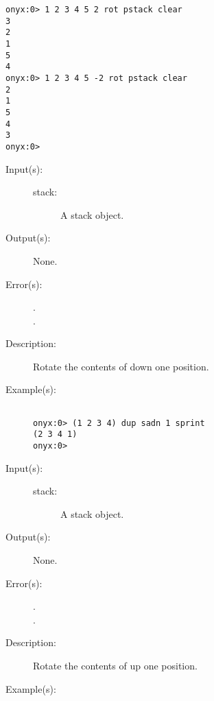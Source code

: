 \begin{description}
\begin{description}
\begin{verbatim}
onyx:0> 1 2 3 4 5 2 rot pstack clear
3
2
1
5
4
onyx:0> 1 2 3 4 5 -2 rot pstack clear
2
1
5
4
3
onyx:0>
		\end{verbatim}
	\end{description}
\label{systemdict:sadn}
\item[{\onyxop{stack}{sadn}{--}}: ]
	\begin{description}\item[]
	\item[Input(s): ]
		\begin{description}\item[]
		\item[stack: ]
			A stack object.
		\end{description}
	\item[Output(s): ] None.
	\item[Error(s): ]
		\begin{description}\item[]
		\item[.]
		\item[.]
		\end{description}
	\item[Description: ]
		Rotate the contents of  down one position.
	\item[Example(s): ]\begin{verbatim}

onyx:0> (1 2 3 4) dup sadn 1 sprint
(2 3 4 1)
onyx:0>
		\end{verbatim}
	\end{description}
\label{systemdict:saup}
\item[{\onyxop{stack}{saup}{--}}: ]
	\begin{description}\item[]
	\item[Input(s): ]
		\begin{description}\item[]
		\item[stack: ]
			A stack object.
		\end{description}
	\item[Output(s): ] None.
	\item[Error(s): ]
		\begin{description}\item[]
		\item[.]
		\item[.]
		\end{description}
	\item[Description: ]
		Rotate the contents of  up one position.
	\item[Example(s): ]\begin{verbatim}


\end{verbatim}
\end{description}
\end{description}

